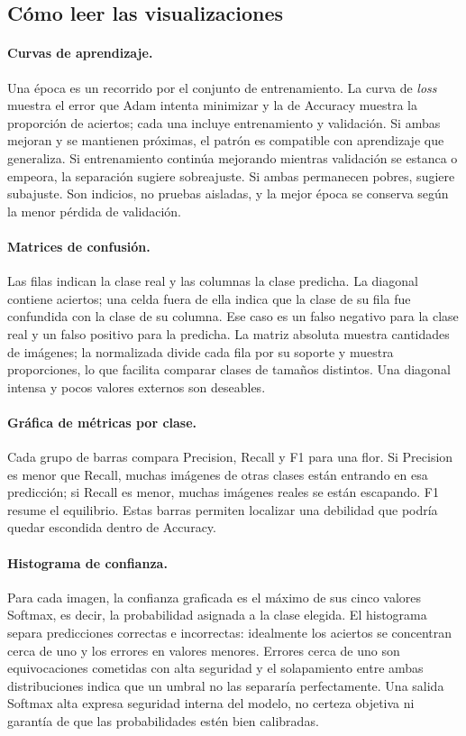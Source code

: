 \documentclass[11pt,letterpaper]{article}
\begin{document}
\subsection{Cómo leer las visualizaciones}
\paragraph{Curvas de aprendizaje.}
Una época es un recorrido por el conjunto de entrenamiento. La curva de
\emph{loss} muestra el error que Adam intenta minimizar y la de Accuracy
muestra la proporción de aciertos; cada una incluye entrenamiento y
validación. Si ambas mejoran y se mantienen próximas, el patrón es compatible
con aprendizaje que generaliza. Si entrenamiento continúa mejorando mientras
validación se estanca o empeora, la separación sugiere sobreajuste. Si ambas
permanecen pobres, sugiere subajuste. Son indicios, no pruebas aisladas, y la
mejor época se conserva según la menor pérdida de validación.

\paragraph{Matrices de confusión.}
Las filas indican la clase real y las columnas la clase predicha. La diagonal
contiene aciertos; una celda fuera de ella indica que la clase de su fila fue
confundida con la clase de su columna. Ese caso es un falso negativo para la
clase real y un falso positivo para la predicha. La matriz absoluta muestra
cantidades de imágenes; la normalizada divide cada fila por su soporte y
muestra proporciones, lo que facilita comparar clases de tamaños distintos.
Una diagonal intensa y pocos valores externos son deseables.

\paragraph{Gráfica de métricas por clase.}
Cada grupo de barras compara Precision, Recall y F1 para una flor. Si Precision
es menor que Recall, muchas imágenes de otras clases están entrando en esa
predicción; si Recall es menor, muchas imágenes reales se están escapando.
F1 resume el equilibrio. Estas barras permiten localizar una debilidad que
podría quedar escondida dentro de Accuracy.

\paragraph{Histograma de confianza.}
Para cada imagen, la confianza graficada es el máximo de sus cinco valores
Softmax, es decir, la probabilidad asignada a la clase elegida. El histograma
separa predicciones correctas e incorrectas: idealmente los aciertos se
concentran cerca de uno y los errores en valores menores. Errores cerca de uno
son equivocaciones cometidas con alta seguridad y el solapamiento entre ambas
distribuciones indica que un umbral no las separaría perfectamente. Una salida
Softmax alta expresa seguridad interna del modelo, no certeza objetiva ni
garantía de que las probabilidades estén bien calibradas.
\end{document}
